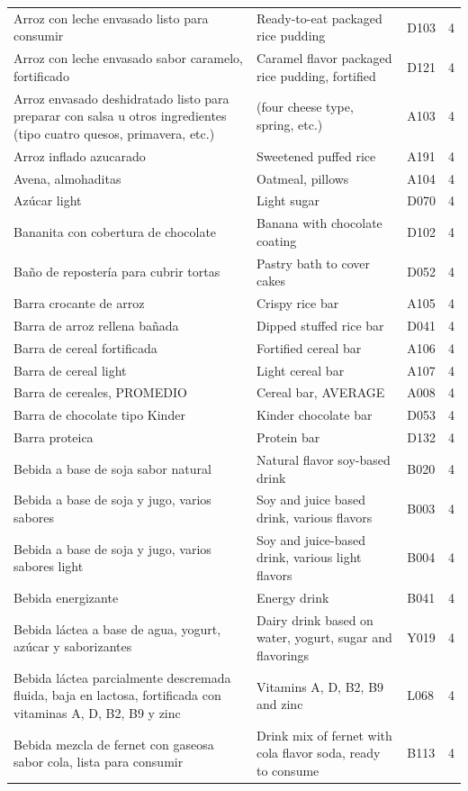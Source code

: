 {\begin{longtable}{p{4.3cm}p{5.5cm}p{1.5cm}p{0.7cm}}
Arroz con leche envasado listo para consumir & Ready-to-eat packaged rice pudding & D103 & 4\\
Arroz con leche envasado sabor caramelo, fortificado & Caramel flavor packaged rice pudding, fortified & D121 & 4\\
Arroz envasado deshidratado listo para preparar con salsa u otros ingredientes (tipo cuatro quesos, primavera, etc.) & (four cheese type, spring, etc.) & A103 & 4\\
Arroz inflado azucarado & Sweetened puffed rice & A191 & 4\\
Avena, almohaditas & Oatmeal, pillows & A104 & 4\\
Azúcar light & Light sugar & D070 & 4\\
Bananita con cobertura de chocolate & Banana with chocolate coating & D102 & 4\\
Baño de repostería para cubrir tortas & Pastry bath to cover cakes & D052 & 4\\
Barra crocante de arroz & Crispy rice bar & A105 & 4\\
Barra de arroz rellena bañada & Dipped stuffed rice bar & D041 & 4\\
Barra de cereal fortificada & Fortified cereal bar & A106 & 4\\
Barra de cereal light & Light cereal bar & A107 & 4\\
Barra de cereales, PROMEDIO & Cereal bar, AVERAGE & A008 & 4\\
Barra de chocolate tipo Kinder & Kinder chocolate bar & D053 & 4\\
Barra proteica & Protein bar & D132 & 4\\
Bebida a base de soja sabor natural & Natural flavor soy-based drink & B020 & 4\\
Bebida a base de soja y jugo, varios sabores & Soy and juice based drink, various flavors & B003 & 4\\
Bebida a base de soja y jugo, varios sabores light & Soy and juice-based drink, various light flavors & B004 & 4\\
Bebida energizante & Energy drink & B041 & 4\\
Bebida láctea a base de agua, yogurt, azúcar y saborizantes & Dairy drink based on water, yogurt, sugar and flavorings & Y019 & 4\\
Bebida láctea parcialmente descremada fluida, baja en lactosa, fortificada con vitaminas A, D, B2, B9 y zinc & Vitamins A, D, B2, B9 and zinc & L068 & 4\\
Bebida mezcla de fernet con gaseosa sabor cola, lista para consumir & Drink mix of fernet with cola flavor soda, ready to consume & B113 & 4\\

\end{longtable}}
